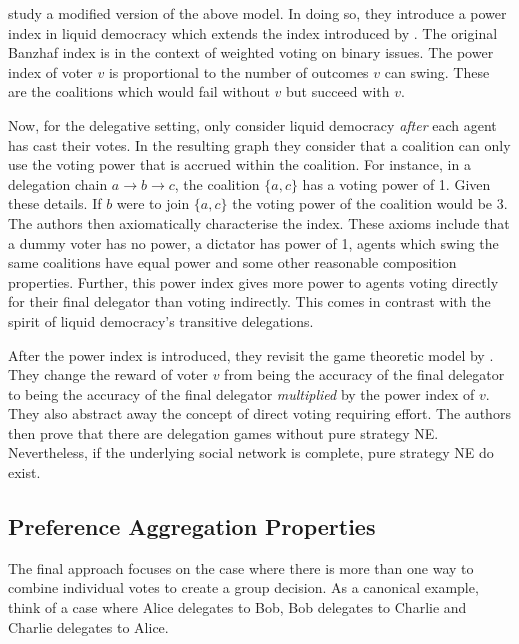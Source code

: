 \documentclass[11pt,a4paper, titlepage]{article}
\theoremstyle{definition}
\begin{document}
\citet{zhang2021power} study a modified version of the above model. In doing so, they introduce a power index in liquid democracy which extends the index introduced by \citet{banzhaf1964weighted}.
The original Banzhaf index is in the context of weighted voting on binary issues.
The power index of voter $v$ is proportional to the number of outcomes $v$ can swing.
These are the coalitions which would fail without $v$ but succeed with $v$.

Now, for the delegative setting, \citeauthor{zhang2021power} only consider liquid democracy \emph{after} each agent has cast their votes.
In the resulting graph they consider that a coalition can only use the voting power that is accrued within the coalition. 
For instance, in a delegation chain $a \to b \to c$, the coalition $\{a, c\}$ has a voting power of 1.
Given these details. If $b$ were to join $\{a, c\}$ the voting power of the coalition would be 3.
The authors then axiomatically characterise the index. These axioms include that a dummy voter has no power, a dictator has power of 1, agents which swing the same coalitions have equal power and some other reasonable composition properties.
Further, this power index gives more power to agents voting directly for their final delegator than voting indirectly.
This comes in contrast with the spirit of liquid democracy's transitive delegations.

After the power index is introduced, they revisit the game theoretic model by \citet{bloembergen2019rational}.
They change the reward of voter $v$ from being the accuracy of the final delegator to being the accuracy of the final delegator \emph{multiplied} by the power index of $v$.
They also abstract away the concept of direct voting requiring effort.
The authors then prove that there are delegation games without pure strategy NE.
Nevertheless, if the underlying social network is complete, pure strategy NE do exist.

\subsection{Preference Aggregation Properties}
The final approach focuses on the case where there is more than one way to combine individual votes to create a group decision. 
As a canonical example, think of a case where Alice delegates to Bob, Bob delegates to Charlie and Charlie delegates to Alice.
\end{document}
